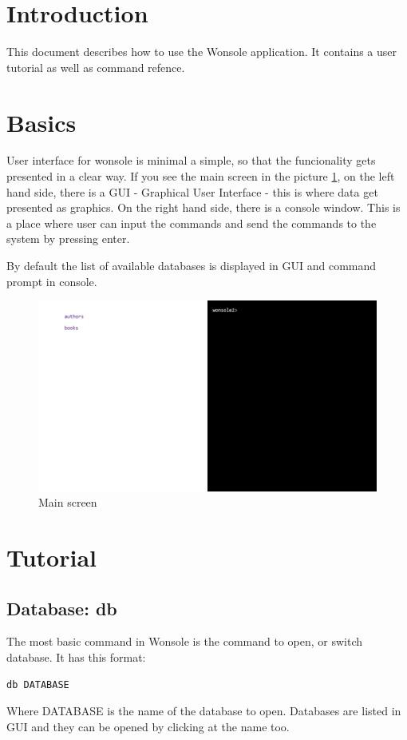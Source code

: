 \section{Introduction}
This document describes how to use the Wonsole application. It contains a user
tutorial as well as command refence.

\section{Basics}
User interface for wonsole is minimal a simple, so that the funcionality gets
presented in a clear way. If you see the main screen in the
picture \ref{wonsole2-00}, on the left hand side, there is a GUI - Graphical
User Interface - this is where data get presented as graphics. On the right hand side, there is a console window. This is a place
where user can input the commands and send the commands to the system by
pressing enter.

By default the list of available databases is displayed in GUI and
command prompt in console.


\begin{figure}
\centering
\includegraphics[width=\textwidth]{../../manual/screenshot/wonsole2/wonsole2-00.png}
\caption{Main screen}
\label{wonsole2-00}
\end{figure}

\section{Tutorial}

\subsection{Database: db}
The most basic command in Wonsole is the command to open, or switch database. It
has this format:
\begin{verbatim}
db DATABASE
\end{verbatim}
Where DATABASE is the name of the database to open. Databases are listed in GUI
and they can be opened by clicking at the name too.


